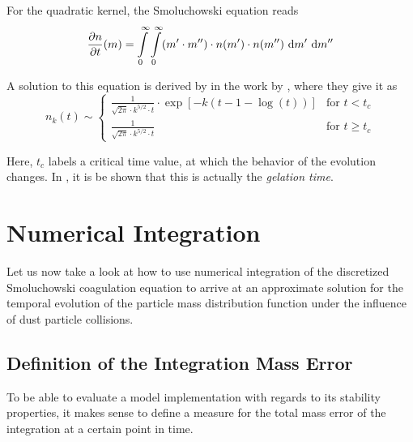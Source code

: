     For the quadratic kernel, the Smoluchowski equation reads
    \begin{equation}
        \frac{\partial n}{\partial t}(m)
            = 
                \int\limits_0^\infty \int\limits_0^\infty
                (m' \cdot m'') \cdot
                n(m') \cdot n(m'')
                \ \text{d} m' \ \text{d} m''
        \label{eq:smoluchowski_with_quadratic_kernel}
    \end{equation}

    A solution to this equation is derived by in the work by \cite{wattis_2006}, 
    where they give it as 
    \begin{equation}
        n_k(t) \sim \begin{cases} 
            \frac{ 1 }{ \sqrt{2\pi} \cdot k^{5/2}\cdot t } \cdot \exp[-k(t-1-\log(t))]
            & \text{for } t < t_c
            \\
            \frac{ 1 }{ \sqrt{2\pi} \cdot k^{5/2}\cdot t }
            & \text{for } t \geq t_c
        \end{cases}
    \end{equation}

    Here, $t_c$ labels a critical time value, at which the behavior of the evolution changes.
    In \cite{wattis_2006}, it is be shown that this is actually the \textit{gelation time}.


\section{Numerical Integration}

    Let us now take a look at how to use numerical integration of the discretized 
    Smoluchowski coagulation equation to arrive at an approximate solution for the temporal 
    evolution of the particle mass distribution function under the influence of dust particle 
    collisions. 

    \subsection{Definition of the Integration Mass Error}

        To be able to evaluate a model implementation with regards to its stability properties,
        it makes sense to define a measure for the total mass error of the integration at 
        a certain point in time. \\

